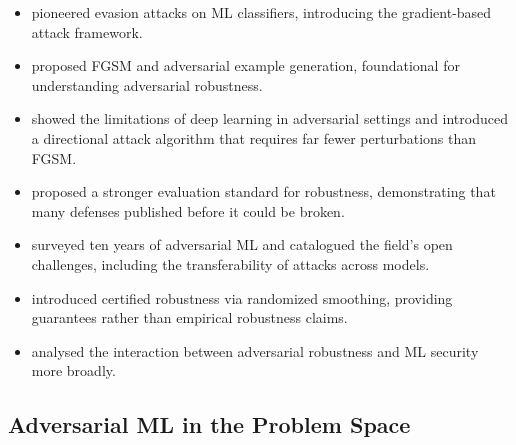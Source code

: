 \documentclass[12pt,a4paper]{report}
\begin{document}
\begin{itemize}
  \item \citet{biggio2013evasion} pioneered evasion attacks on ML classifiers, introducing the gradient-based attack framework.
  
  \item \citet{goodfellow2014explaining} proposed FGSM and adversarial example generation, foundational for understanding adversarial robustness.
  
  \item \citet{papernot2016limits} showed the limitations of deep learning in adversarial settings and introduced a directional attack algorithm that requires far fewer perturbations than FGSM.
  
  \item \citet{carlini2016towards} proposed a stronger evaluation standard for robustness, demonstrating that many defenses published before it could be broken.
  
  \item \citet{roli2018wild} surveyed ten years of adversarial ML and catalogued the field's open challenges, including the transferability of attacks across models.
  
  \item \citet{carlini2019certified} introduced certified robustness via randomized smoothing, providing guarantees rather than empirical robustness claims.
  
  \item \citet{bruckner2021machine} analysed the interaction between adversarial robustness and ML security more broadly.
\end{itemize}

\subsection{Adversarial ML in the Problem Space}
\end{document}
